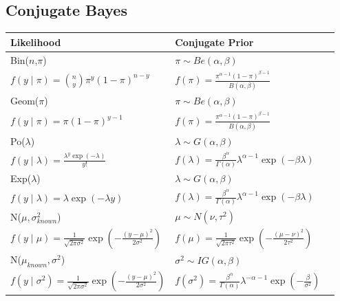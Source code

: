 \documentclass{article}\usepackage[]{graphicx}\usepackage[]{xcolor}
\begin{document}
\begin{multicols*}{2}
\subsection{Conjugate Bayes}
\begin{center}
\begin{tabular}{lll}
  \hline
Likelihood & Conjugate Prior \\ 
  \hline
Bin($n$,$\pi$) & $\pi\sim Be(\alpha,\beta)$ \\ 
  $f(y\mid\pi)=\binom{n}{y}\pi^y(1-\pi)^{n-y}$ & $f(\pi)=\frac{\pi^{\alpha-1}(1-\pi)^{\beta-1}}{B(\alpha,\beta)}$ \\ 
   \hline
Geom($\pi$) & $\pi\sim Be(\alpha,\beta)$ \\ 
  $f(y\mid\pi)=\pi(1-\pi)^{y-1}$ & $f(\pi)=\frac{\pi^{\alpha-1}(1-\pi)^{\beta-1}}{B(\alpha,\beta)}$ \\ 
   \hline
Po($\lambda$) & $\lambda\sim G(\alpha,\beta)$ \\ 
  $f(y\mid\lambda)=\frac{\lambda^y\exp(-\lambda)}{y!}$ & $f(\lambda)=\frac{\beta^\alpha}{\Gamma(\alpha)}\lambda^{\alpha-1}\exp(-\beta\lambda)$ \\ 
   \hline
Exp($\lambda$) & $\lambda\sim G(\alpha,\beta)$ \\ 
  $f(y\mid\lambda)=\lambda\exp(-\lambda y)$ & $f(\lambda)=\frac{\beta^\alpha}{\Gamma(\alpha)}\lambda^{\alpha-1}\exp(-\beta\lambda)$ \\ 
   \hline
N($\mu,\sigma_{known}^2$) & $\mu\sim N(\nu,\tau^2)$ \\ 
  $f(y\mid\mu)=\frac{1}{\sqrt{2\pi\sigma^2}}\exp\left(-\frac{(y-\mu)^2}{2\sigma^2}\right)$ & $f(\mu)=\frac{1}{\sqrt{2\pi\tau^2}}\exp\left(-\frac{(\mu-\nu)^2}{2\tau^2}\right)$ \\ 
   \hline
N($\mu_{known},\sigma^2$) & $\sigma^2\sim IG(\alpha,\beta)$ \\ 
  $f(y\mid\sigma^2)=\frac{1}{\sqrt{2\pi\sigma^2}}\exp\left(-\frac{(y-\mu)^2}{2\sigma^2}\right)$ & $f(\sigma^2)=\frac{\beta^\alpha}{\Gamma(\alpha)}\lambda^{-\alpha-1}\exp\left(-\frac{\beta}{\sigma^2}\right)$ \\ 
   \hline


\end{tabular}
\end{center}
\end{multicols*}
\end{document}
